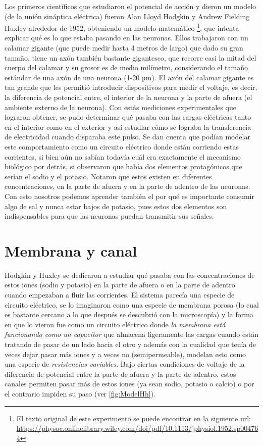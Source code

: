 Los primeros científicos que estudiaron el potencial de acción y dieron un modelo (de la unión sináptica eléctrica) fueron Alan Lloyd Hodgkin y Andrew Fielding Huxley alrededor de 1952, obteniendo un modelo matemático \footnote{El texto original de este experimento se puede encontrar en la siguiente url: \url{ https://physoc.onlinelibrary.wiley.com/doi/pdf/10.1113/jphysiol.1952.sp004764}}, que intenta explicar qué es lo que estaba pasando en las neuronas. Ellos trabajaron con un calamar gigante (que puede medir hasta 4 metros de largo) que dado su gran tamaño, tiene un axón también bastante gigantesco, que recorre casi la mitad del cuerpo del calamar y su grosor es de medio milímetro, considerando el tamaño estándar de una axón de una neurona (1-20 µm). El axón del calamar gigante es tan grande que les permitió introducir dispositivos para medir el voltaje, es decir, la diferencia de potencial entre, el interior de la neurona y la parte de afuera (el ambiente externo de la neurona). Con estás mediciones experimentales que lograron obtener, se pudo determinar qué pasaba con las cargas eléctricas tanto en el interior como en el exterior y así estudiar cómo se lograba la transferencia de electricidad cuando disparaba este pulso. 
 Se dan cuenta que podían modelar este comportamiento como un circuito eléctrico donde están corriendo estas corrientes, si bien aún no sabían todavía cuál era exactamente el mecanismo biológico por detrás, si observaron que había dos elementos protagónicos que serían el sodio y el potasio.
 Notaron que estos existen en diferentes concentraciones, en la parte de afuera y en la parte de adentro de las neuronas. Con esto nosotros podemos aprender también el por qué es importante consumir algo de sal y nunca estar bajos de potasio, pues estos dos elementos son indispensables para que las neuronas puedan transmitir sus señales. 

\section{Membrana y canal}

Hodgkin y Huxley se dedicaron a estudiar qué pasaba con las concentraciones de estos iones (sodio y potasio) en la parte de afuera o en la parte de adentro cuando empezaban a fluir las corrientes. El sistema parecía una especie de circuito eléctrico, se lo imaginaron como una especie de membrana porosa (lo cual es bastante cercano a lo que después se descubrió  con la microscopía) y la forma en que lo vieron fue como un circuito eléctrico donde  \textit{la membrana está funcionando como un capacitor} que almacena ligeramente las cargas cuando están tratando de pasar de un lado hacia el otro y además con la cualidad que tenía de veces dejar pasar más iones y a veces no (semipermeable), modelan esto como una especie de \textit{resistencias variables}. Bajo ciertas condiciones de voltaje de la diferencia de potencial entre la parte de afuera y la parte de adentro, estos canales permiten pasar más de estos iones (ya sean sodio, potasio o calcio) o por el contrario impiden su paso (ver \ref{fig:ModelHh}).


